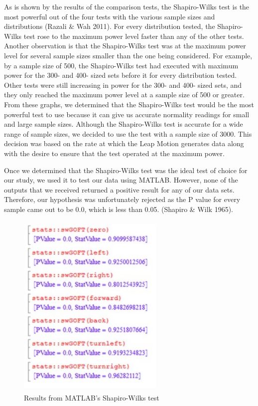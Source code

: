 \documentclass[letterpaper,english, 12pt]{article}
\begin{document}
As is shown by the results of the comparison tests, the Shapiro-Wilks test is the most powerful out of the four tests with the various sample sizes and distributions (Razali \& Wah 2011). For every distribution tested, the Shapiro-Wilks test rose to the maximum power level faster than any of the other tests. Another observation is that the Shapiro-Wilks test was at the maximum power level for several sample sizes smaller than the one being considered. For example, by a sample size of 500, the Shapiro-Wilks test had executed with maximum power for the 300- and 400- sized sets before it for every distribution tested. Other tests were still increasing in power for the 300- and 400- sized sets, and they only reached the maximum power level at a sample size of 500 or greater. From these graphs, we determined that the Shapiro-Wilks test would be the most powerful test to use because it can give us accurate normality readings for small and large sample sizes. Although the Shapiro-Wilks test is accurate for a wide range of sample sizes, we decided to use the test with a sample size of 3000. This decision was based on the rate at which the Leap Motion generates data along with the desire to ensure that the test operated at the maximum power.

Once we determined that the Shapiro-Wilks test was the ideal test of choice for our study, we used it to test our data using MATLAB. However, none of the outputs that we received returned a positive result for any of our data sets. Therefore, our hypothesis was unfortunately rejected as the P value for every sample came out to be 0.0, which is less than 0.05. (Shapiro \& Wilk 1965). 

\begin{figure}[H]
	\centering
	\includegraphics[height=9cm,width=70mm]{pics/swMatlab.jpg}
	\caption{Results from MATLAB's Shapiro-Wilks test}
\end{figure}
\end{document}
